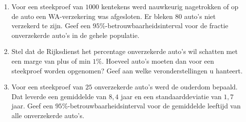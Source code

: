 \begin{enumerate}[label=(\alph*)]
    \item Voor een steekproef van $1000$ kentekens werd nauwkeurig nagetrokken of op de auto een WA-verzekering was afgesloten.
    Er bleken $80$ auto's niet verzekerd te zijn.
    Geef een $95\%$-betrouwbaarheidsinterval voor de fractie onverzekerde auto's in de gehele populatie.
    \answer{

    }

    \item Stel dat de Rijksdienst het percentage onverzekerde auto's wil schatten met een marge van plus of min $1\%$.
    Hoeveel auto's moeten dan voor een steekproef worden opgenomen?
    Geef aan welke veronderstellingen u hanteert.
    \answer{
        
    }

    \item Voor een steekproef van $25$ onverzekerde auto's werd de ouderdom bepaald.
    Dat leverde een gemiddelde van $8,4$ jaar en een standaarddeviatie van $1,7$ jaar.
    Geef een $95\%$-betrouwbaarheidsinterval voor de gemiddelde leeftijd van alle onverzekerde auto's.
    \answer{
        
    }
\end{enumerate}